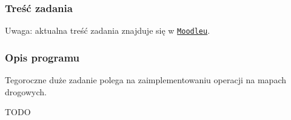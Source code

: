 \subsubsection*{Treść zadania}

Uwaga\+: aktualna treść zadania znajduje się w \href{https://moodle.mimuw.edu.pl}{\tt Moodle\textquotesingle{}u}.

\subsubsection*{Opis programu}

Tegoroczne duże zadanie polega na zaimplementowaniu operacji na mapach drogowych.

T\+O\+DO 